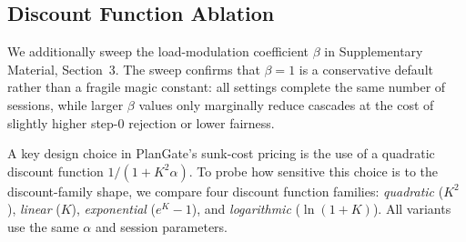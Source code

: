 \documentclass[sigconf,review,anonymous]{acmart}
\begin{document}
\subsection{Discount Function Ablation}
We additionally sweep the load-modulation coefficient $\beta$ in Supplementary Material, Section~3. The sweep confirms that $\beta{=}1$ is a conservative default rather than a fragile magic constant: all settings complete the same number of sessions, while larger $\beta$ values only marginally reduce cascades at the cost of slightly higher step-0 rejection or lower fairness.
\label{sec:discountablation}

A key design choice in PlanGate's sunk-cost pricing is the use of a quadratic discount function $1/(1+K^2\alpha)$. To probe how sensitive this choice is to the discount-family shape, we compare four discount function families: \emph{quadratic} ($K^2$), \emph{linear} ($K$), \emph{exponential} ($e^{K}-1$), and \emph{logarithmic} ($\ln(1+K)$). All variants use the same $\alpha$ and session parameters.

\begin{table}[t]
\caption{Discount function diagnostic/sensitivity ablation (500 sessions, pure ReAct mode \texttt{ps\_ratio=0.0}, averaged over 5 runs). Under the current artifact summary, exponential and linear complete more sessions and achieve higher effective goodput than quadratic and logarithmic; this table is used as diagnostic evidence rather than as a proof of global optimality for any single discount family.}
\label{tab:discount}
\small
{}
\end{table}
\end{document}
